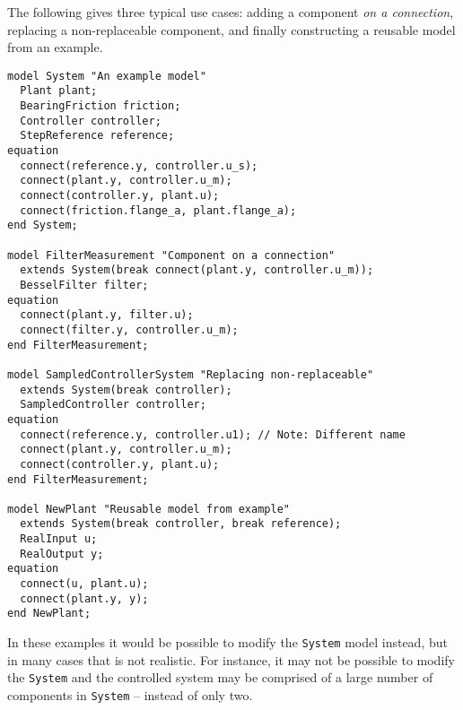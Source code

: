 \begin{example}
The following gives three typical use cases: adding a component \emph{on a connection}, replacing a non-replaceable component, and finally constructing a reusable model from an example.
\begin{lstlisting}[language=modelica]
model System "An example model"
  Plant plant;
  BearingFriction friction;
  Controller controller;
  StepReference reference;
equation
  connect(reference.y, controller.u_s);
  connect(plant.y, controller.u_m);
  connect(controller.y, plant.u);
  connect(friction.flange_a, plant.flange_a);
end System;

model FilterMeasurement "Component on a connection"
  extends System(break connect(plant.y, controller.u_m));
  BesselFilter filter;
equation
  connect(plant.y, filter.u);
  connect(filter.y, controller.u_m);
end FilterMeasurement;

model SampledControllerSystem "Replacing non-replaceable"
  extends System(break controller);
  SampledController controller;
equation
  connect(reference.y, controller.u1); // Note: Different name
  connect(plant.y, controller.u_m);
  connect(controller.y, plant.u);
end FilterMeasurement;

model NewPlant "Reusable model from example"
  extends System(break controller, break reference);
  RealInput u;
  RealOutput y;
equation
  connect(u, plant.u);
  connect(plant.y, y);
end NewPlant;
\end{lstlisting}
In these examples it would be possible to modify the \lstinline!System! model instead, but in many cases that is not realistic.
For instance, it may not be possible to modify the \lstinline!System! and the controlled system may be comprised of a large number of components in \lstinline!System! -- instead of only two.
\end{example}

